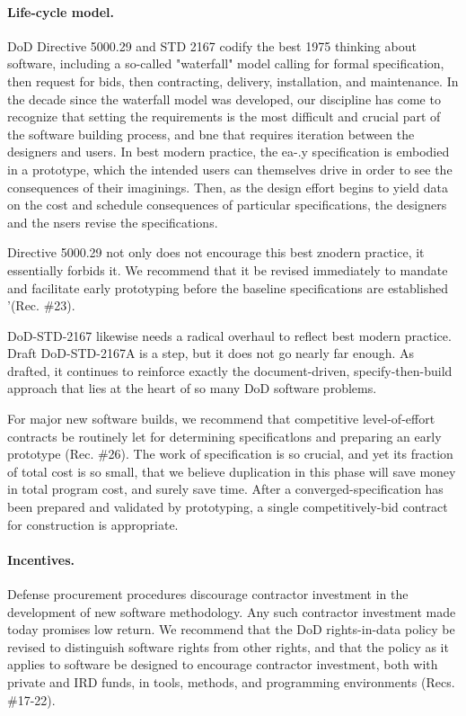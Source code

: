 \documentclass[12pt]{article}
\begin{document}
\paragraph{Life-cycle model.} DoD Directive 5000.29 and STD 2167 codify the best 1975 thinking
about software, including a so-called "waterfall" model calling for formal specification, then
request for bids, then contracting, delivery, installation, and maintenance. In the decade
since the waterfall model was developed, our discipline has come to recognize that setting
the requirements is the most difficult and crucial part of the software building process, and
bne that requires iteration between the designers and users. In best modern practice, the
ea-.y specification is embodied in a prototype, which the intended users can themselves
drive in order to see the consequences of their imaginings. Then, as the design effort
begins to yield data on the cost and schedule consequences of particular specifications, the
designers and the nsers revise the specifications.

Directive 5000.29 not only does not encourage this best znodern practice, it essentially
forbids it. We recommend that it be revised immediately to mandate and facilitate early
prototyping before the baseline specifications are established '(Rec. \#23).

DoD-STD-2167 likewise needs a radical overhaul to reflect best modern practice. Draft
DoD-STD-2167A is a step, but it does not go nearly far enough. As drafted, it continues to
reinforce exactly the document-driven, specify-then-build approach that lies at the heart
of so many DoD software problems.

For major new software builds, we recommend that competitive level-of-effort contracts
be routinely let for determining specificatlons and preparing an early prototype (Rec. \#26).
The work of specification is so crucial, and yet its fraction of total cost is so small, that
we believe duplication in this phase will save money in total program cost, and surely save
time. After a converged-specification has been prepared and validated by prototyping, a
single competitively-bid contract for construction is appropriate.

\paragraph{Incentives.} Defense procurement procedures discourage contractor investment in the
development of new software methodology. Any such contractor investment made today
promises low return. We recommend that the DoD rights-in-data policy be revised to
distinguish software rights from other rights, and that the policy as it applies to software
be designed to encourage contractor investment, both with private and IRD funds, in tools,
methods, and programming environments (Recs. \#17-22).
\end{document}
